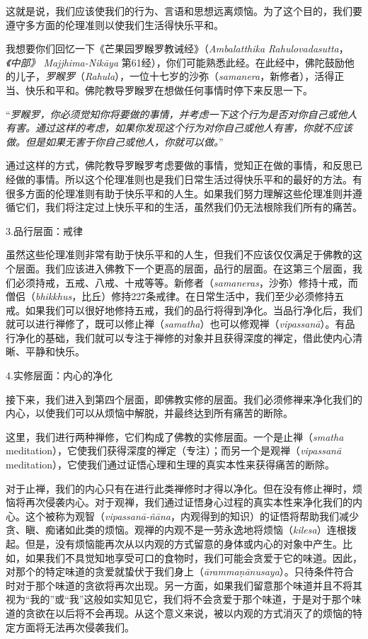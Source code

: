 \1这就是说，我们应该使我们的行为、言语和思想远离烦恼。为了这个目的，我们要遵守多方面的伦理准则以使我们生活得快乐平和。

我想要你们回忆一下《芒果园罗睺罗教诫经》（{\it Ambalatthika Rahulovadasutta}，{\it 《中部》 Majjhima-Nik\=aya} 第61经），你们可能熟悉此经。在此经中，佛陀鼓励他的儿子，{\it 罗睺罗}（{\it Rahula}），一位十七岁的沙弥（{\it samanera}，新修者），活得正当、快乐和平和。佛陀教导罗睺罗在想做任何事情时停下来反思一下。

“{\it 罗睺罗，你必须觉知你将要做的事情，并考虑一下这个行为是否对你自己或他人有害。通过这样的考虑，如果你发现这个行为对你自己或他人有害，你就不应该做。但是如果无害于你自己或他人，你就可以做。}”

通过这样的方式，佛陀教导罗睺罗考虑要做的事情，觉知正在做的事情，和反思已经做的事情。所以这个伦理准则也是我们日常生活过得快乐平和的最好的方法。有很多方面的伦理准则有助于快乐平和的人生。如果我们努力理解这些伦理准则并遵循它们，我们将注定过上快乐平和的生活，虽然我们仍无法根除我们所有的痛苦。

\sssubsectnon 3.品行层面：戒律

虽然这些伦理准则非常有助于快乐平和的人生，但我们不应该仅仅满足于佛教的这个层面。我们应该进入佛教下一个更高的层面，品行的层面。在这第三个层面，我们必须持戒，五戒、八戒、十戒等等。新修者（{\it samaneras}，沙弥）修持十戒，\1而僧侣（{\it bhikkhus}，比丘）修持227条戒律。在日常生活中，我们至少必须修持五戒。如果我们可以很好地修持五戒，我们的品行将得到净化。当品行净化后，我们就可以进行禅修了，既可以修止禅（{\it samatha}）也可以修观禅（{\it vipassan\=a}）。有品行净化的基础，我们就可以专注于禅修的对象并且获得深度的禅定，借此使内心清晰、平静和快乐。

\sssubsectnon 4.实修层面：内心的净化

接下来，我们进入到第四个层面，即佛教实修的层面。我们必须修禅来净化我们的内心，以使我们可以从烦恼中解脱，并最终达到所有痛苦的断除。

这里，我们进行两种禅修，它们构成了佛教的实修层面。一个是止禅（{\it smatha} meditation），它使我们获得深度的禅定（专注）；而另一个是观禅（{\it vipassan\=a} meditation），它使我们通过证悟心理和生理的真实本性来获得痛苦的断除。

对于止禅，我们的内心只有在进行此类禅修时才得以净化。但在没有修止禅时，烦恼将再次侵袭内心。对于观禅，我们通过证悟身心过程的真实本性来净化我们的内心。这个被称为观智（{\it vipassan\=a-\~n\=ana}，内观得到的知识）的证悟将帮助我们减少贪、瞋、痴诸如此类的烦恼。观禅的内观不是一劳永逸地将烦恼（{\it kilesa}）连根拨起。但是，没有烦恼能再次从以内观的方式留意的身体或内心的对象中产生。\1比如，如果我们不具觉知地享受可口的食物时，我们可能会贪爱于它的味道。因此，对那个的特定味道的贪爱就蛰伏于我们身上（{\it \=aramma\d n\=anusaya}）。只待条件符合时对于那个味道的贪欲将再次出现。另一方面，如果我们留意那个味道并且不将其视为“我的”或“我”这般如实知见它，我们将不会贪爱于那个味道，于是对于那个味道的贪欲在以后将不会再现。从这个意义来说，被以内观的方式消灭了的烦恼的特定方面将无法再次侵袭我们。

